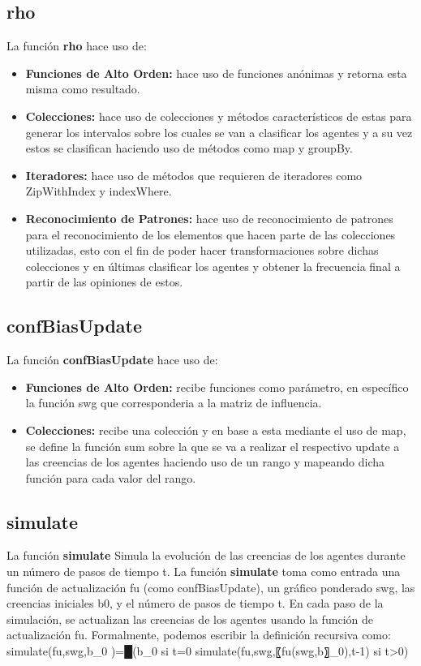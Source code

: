 \documentclass{article}
\begin{document}
    \subsection{rho}
    La función \textbf{rho} hace uso de:

    \begin{itemize}
      \item \textbf{Funciones de Alto Orden:} hace uso de funciones anónimas y retorna esta misma como resultado.
      \item \textbf{Colecciones:} hace uso de colecciones y métodos característicos de estas para generar los intervalos sobre los cuales se van a clasificar los agentes y a su vez estos se clasifican haciendo uso de métodos como map y groupBy.
      \item \textbf{Iteradores:} hace uso de métodos que requieren de iteradores como ZipWithIndex y indexWhere.
      \item \textbf{Reconocimiento de Patrones:} hace uso de reconocimiento de patrones para el reconocimiento de los elementos que hacen parte de las colecciones utilizadas, esto con el fin de poder hacer transformaciones sobre dichas colecciones y en últimas clasificar los agentes y obtener la frecuencia final a partir de las opiniones de estos.
    \end{itemize}

    \subsection{confBiasUpdate}
    La función \textbf{confBiasUpdate} hace uso de:

    \begin{itemize}
      \item \textbf{Funciones de Alto Orden:} recibe funciones como parámetro, en específico la función swg que corresponderia a la matriz de influencia.
      \item \textbf{Colecciones:} recibe una colección y en base a esta mediante el uso de map, se define la función sum sobre la que se va a realizar el respectivo update a las creencias de los agentes haciendo uso de un rango y mapeando dicha función para cada valor del rango.
    \end{itemize}

    \subsection{simulate}
    La función \textbf{simulate} Simula la evolución de las creencias de los agentes durante un número de pasos de tiempo t.
    La función \textbf{simulate} toma como entrada una función de actualización fu (como confBiasUpdate), un gráfico ponderado swg, las creencias iniciales b0, y el número de pasos de tiempo t.
    En cada paso de la simulación, se actualizan las creencias de los agentes usando la función de actualización fu.
    Formalmente, podemos escribir la definición recursiva como:
    simulate(fu,swg,b_0 )={█(b_0                               si t=0 }
                          {simulate(fu,swg,〖fu(swg,b〗_0),t-1) si t>0)}
\end{document}
